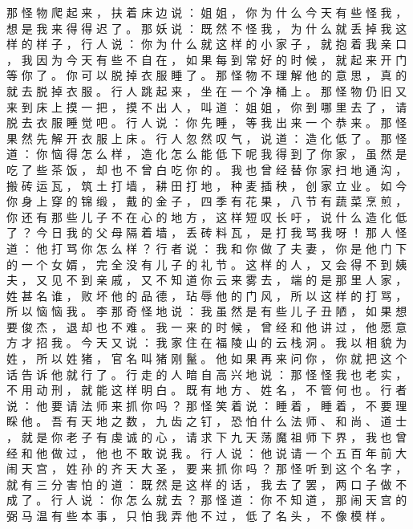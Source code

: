 {那 怪 物 爬 起 来 ， 扶 着 床 边 说 ： 姐 姐 ， 你 为 什 么 今 天 有 些 怪 我 ， 想 是 我 来 得 得 迟 了 。
那 妖 说 ： 既 然 不 怪 我 ， 为 什 么 就 丢 掉 我 这 样 的 样 子 ， 行 人 说 ： 你 为 什 么 就 这 样 的 小 家 子 ， 就 抱 着 我 亲 口 ， 我 因 为 今 天 有 些 不 自 在 ， 如 果 每 到 常 好 的 时 候 ， 就 起 来 开 门 等 你 了 。
你 可 以 脱 掉 衣 服 睡 了 。
那 怪 物 不 理 解 他 的 意 思 ， 真 的 就 去 脱 掉 衣 服 。
行 人 跳 起 来 ， 坐 在 一 个 净 桶 上 。
那 怪 物 仍 旧 又 来 到 床 上 摸 一 把 ， 摸 不 出 人 ， 叫 道 ： 姐 姐 ， 你 到 哪 里 去 了 ， 请 脱 去 衣 服 睡 觉 吧 。
行 人 说 ： 你 先 睡 ， 等 我 出 来 一 个 恭 来 。
那 怪 果 然 先 解 开 衣 服 上 床 。
行 人 忽 然 叹 气 ， 说 道 ： 造 化 低 了 。
那 怪 道 ： 你 恼 得 怎 么 样 ， 造 化 怎 么 能 低 下 呢 我 得 到 了 你 家 ， 虽 然 是 吃 了 些 茶 饭 ， 却 也 不 曾 白 吃 你 的 。 我 也 曾 经 替 你 家 扫 地 通 沟 ， 搬 砖 运 瓦 ， 筑 土 打 墙 ， 耕 田 打 地 ， 种 麦 插 秧 ， 创 家 立 业 。
如 今 你 身 上 穿 的 锦 缎 ， 戴 的 金 子 ， 四 季 有 花 果 ， 八 节 有 蔬 菜 烹 煎 ， 你 还 有 那 些 儿 子 不 在 心 的 地 方 ， 这 样 短 叹 长 吁 ， 说 什 么 造 化 低 了 ？
今 日 我 的 父 母 隔 着 墙 ， 丢 砖 料 瓦 ， 是 打 我 骂 我 呀 ！
那 人 怪 道 ： 他 打 骂 你 怎 么 样 ？ 行 者 说 ： 我 和 你 做 了 夫 妻 ， 你 是 他 门 下 的 一 个 女 婿 ， 完 全 没 有 儿 子 的 礼 节 。
这 样 的 人 ， 又 会 得 不 到 姨 夫 ， 又 见 不 到 亲 戚 ， 又 不 知 道 你 云 来 雾 去 ， 端 的 是 那 里 人 家 ， 姓 甚 名 谁 ， 败 坏 他 的 品 德 ， 玷 辱 他 的 门 风 ， 所 以 这 样 的 打 骂 ， 所 以 恼 恼 我 。
李 那 奇 怪 地 说 ： 我 虽 然 是 有 些 儿 子 丑 陋 ， 如 果 想 要 俊 杰 ， 退 却 也 不 难 。
我 一 来 的 时 候 ， 曾 经 和 他 讲 过 ， 他 愿 意 方 才 招 我 。
今 天 又 说 ： 我 家 住 在 福 陵 山 的 云 栈 洞 。
我 以 相 貌 为 姓 ， 所 以 姓 猪 ， 官 名 叫 猪 刚 鬣 。
他 如 果 再 来 问 你 ， 你 就 把 这 个 话 告 诉 他 就 行 了 。
行 走 的 人 暗 自 高 兴 地 说 ： 那 怪 怪 我 也 老 实 ， 不 用 动 刑 ， 就 能 这 样 明 白 。
既 有 地 方 、 姓 名 ， 不 管 何 也 。
行 者 说 ： 他 要 请 法 师 来 抓 你 吗 ？
那 怪 笑 着 说 ： 睡 着 ， 睡 着 ， 不 要 理 睬 他 。
吾 有 天 地 之 数 ， 九 齿 之 钉 ， 恐 怕 什 么 法 师 、 和 尚 、 道 士 ， 就 是 你 老 子 有 虔 诚 的 心 ， 请 求 下 九 天 荡 魔 祖 师 下 界 ， 我 也 曾 经 和 他 做 过 ， 他 也 不 敢 说 我 。
行 人 说 ： 他 说 请 一 个 五 百 年 前 大 闹 天 宫 ， 姓 孙 的 齐 天 大 圣 ， 要 来 抓 你 吗 ？
那 怪 听 到 这 个 名 字 ， 就 有 三 分 害 怕 的 道 ： 既 然 是 这 样 的 话 ， 我 去 了 罢 ， 两 口 子 做 不 成 了 。
行 人 说 ： 你 怎 么 就 去 ？ 那 怪 道 ： 你 不 知 道 ， 那 闹 天 宫 的 弼 马 温 有 些 本 事 ， 只 怕 我 弄 他 不 过 ， 低 了 名 头 ， 不 像 模 样 。
}
